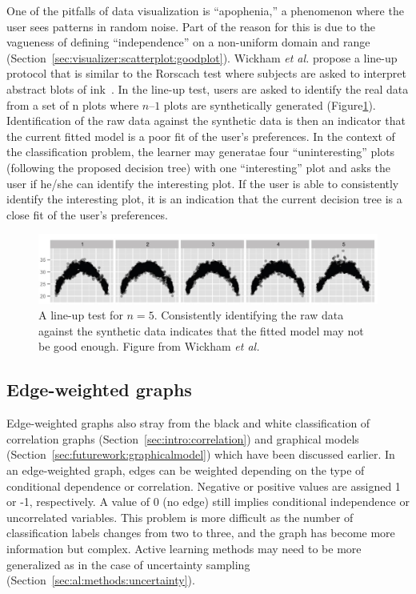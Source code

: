One of the pitfalls of data visualization is ``apophenia,'' a phenomenon where
the user sees patterns in random noise. Part of the reason for this is due to
the vagueness of defining ``independence'' on a non-uniform domain and range
(Section~\ref{sec:visualizer:scatterplot:goodplot}). Wickham \textit{et al.} 
propose a line-up protocol that is similar to the Rorscach test where subjects 
are asked to interpret abstract blots of ink~\cite{wickham2010}. 
In the line-up test,
users are asked to identify the real data from a set of n plots where $n – 1$
plots are synthetically generated (Figure\ref{fig:visualizer:lineup}). 
Identification of the raw data against the synthetic data is then an indicator 
that the current fitted model is a poor fit of the user's preferences.
In the context of the classification problem, the learner may generatae
four ``uninteresting'' plots (following the proposed decision tree) with one
``interesting'' plot and asks the user if he/she can identify the interesting
plot. If the user is able to consistently identify the interesting plot, it is
an indication that the current decision tree is a close fit of the user’s
preferences.

\begin{figure}[H]
	\begin{center}
		\includegraphics[width=1\linewidth]{ch-visualizer/figures/lineup}
		\caption[A line-up test for $n = 5$. ]{A line-up test for $n = 5$.
			Consistently identifying the raw data against the synthetic data 
			indicates that
			the fitted model may not be good enough. Figure from Wickham 
			\textit{et al.}~\cite{wickham2010}}
		\label{fig:visualizer:lineup}
	\end{center}
\end{figure}

\subsection{Edge-weighted graphs}
\label{sec:futurework:edgeweighted}

Edge-weighted graphs also stray from the black and white classification of 
correlation graphs (Section~\ref{sec:intro:correlation}) and graphical models 
(Section~\ref{sec:futurework:graphicalmodel}) which have been discussed 
earlier. In an edge-weighted graph, edges can be weighted depending
on the type of conditional dependence or correlation. Negative or positive 
values are assigned 1 or -1, respectively. A value of 0 (no edge) still implies 
conditional independence or uncorrelated variables. This problem is more 
difficult as the number of classification labels changes from two to three, and 
the graph has become more information but complex. 
Active learning methods may need to be more generalized as in the case of 
uncertainty sampling (Section~\ref{sec:al:methods:uncertainty}). 

